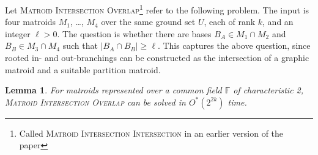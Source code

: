 \documentclass[10pt,a4paper]{article}
\newtheorem{lemma}{Lemma}[section]
\newcommand{\F}{\ensuremath{\mathbb F}\xspace}
\begin{document}
Let \textsc{Matroid Intersection Overlap}\footnote{Called
  \textsc{Matroid Intersection Intersection} in an earlier version of
  the paper} refer to the
following problem. The input is four matroids $M_1$, \ldots, $M_4$
over the same ground set $U$, each of rank $k$, and an integer $\ell>0$.
The question is whether there are bases $B_A \in M_1 \cap M_2$
and $B_B \in M_3 \cap M_4$ such that $|B_A \cap B_B| \geq \ell$.
This captures the above question, since rooted in- and
out-branchings can be constructed as the intersection of a graphic
matroid and a suitable partition matroid. 

\begin{lemma}
  For matroids represented over a common field $\F$ of characteristic 2, 
  \textsc{Matroid Intersection Overlap} can be solved in
  $O^*(2^{2k})$ time. 
\end{lemma}
\end{document}
